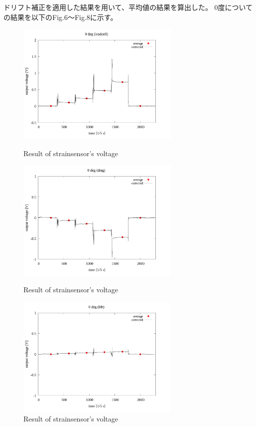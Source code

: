 \documentclass[twocolumn,a4j]{jsarticle}
\begin{document}
ドリフト補正を適用した結果を用いて、平均値の結果を算出した。
0度についての結果を以下のFig.6～Fig.8に示す。

\begin{figure}[htbp]
    \footnotesize
    \begin{center}
        \includegraphics[width=78mm]{../images/average/0_loadcell_average.png}
        \caption{Result of strainsensor's voltage}
        \includegraphics[width=78mm]{../images/average/0_drag_average.png}
        \caption{Result of strainsensor's voltage}
        \includegraphics[width=78mm]{../images/average/0_lift_average.png}
        \caption{Result of strainsensor's voltage}
    \end{center}
\end{figure}
\newpage
\end{document}
